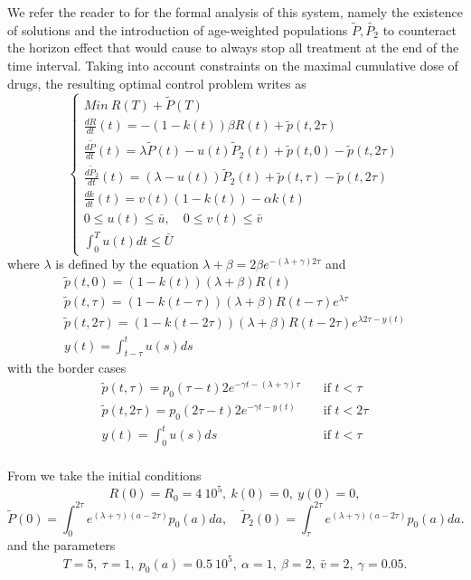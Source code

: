 \documentclass[a4paper]{article}
\begin{document}
We refer the reader to \cite{Dupuis14} for the formal analysis of this system, namely the existence of solutions and the 
introduction of age-weighted populations $\tilde{P}, \tilde{P_2}$ to counteract the horizon effect that would cause 
to always stop all treatment at the end of the time interval.
Taking into account constraints on the maximal cumulative dose of drugs, the resulting optimal control problem writes as
$$
\left \lbrace \begin{array}{l}
Min \ R(T) + \tilde{P}(T)\\
\frac{dR}{dt}(t) = -(1-k(t)) \beta R(t) + \tilde{p}(t,2\tau)\\
\frac{d\tilde{P}}{dt}(t) = \lambda \tilde{P}(t) - u(t) \tilde{P}_2(t) + \tilde{p}(t,0) - \tilde{p}(t,2\tau)\\
\frac{d\tilde{P}_2}{dt}(t) = (\lambda - u(t)) \tilde{P}_2(t) + \tilde{p}(t,\tau) - \tilde{p}(t,2\tau)\\
\frac{dk}{dt}(t) = v(t) (1-k(t)) - \alpha k(t)\\
0 \le u(t) \le \bar{u}, \quad 0 \le v(t) \le \bar{v}\\
\int_0^T u(t) dt \le \bar{U}
\end{array} \right .
$$
where $\lambda$ is defined by the equation $\lambda+\beta = 2 \beta e^{-(\lambda+\gamma)2\tau}$ and
$$
\begin{array}{l}
\tilde{p}(t,0)  =  (1-k(t))(\lambda+\beta)R(t)\\
\tilde{p}(t,\tau)  =  (1-k(t-\tau))(\lambda+\beta)R(t-\tau)e^{\lambda \tau}\\
\tilde{p}(t,2\tau)  =  (1-k(t-2\tau))(\lambda+\beta)R(t-2\tau)e^{\lambda 2\tau - y(t)}\\
y(t)  = \int_{t-\tau}^t u(s)ds
\end{array}
$$
with the border cases
$$
\begin{array}{ll}
\tilde{p}(t,\tau)  = p_0(\tau-t)2 e^{-\gamma t - (\lambda+\gamma)\tau} &\quad \text{if } t<\tau\\
\tilde{p}(t,2\tau)  = p_0(2\tau-t)2 e^{-\gamma t - y(t)} &\quad \text{if } t<2\tau \\
y(t)  = \int_0^t u(s)ds &\quad \text{if } t<\tau\\
\end{array}
$$

\noindent From \cite{Dupuis14} we take the initial conditions
$$
R(0)=R_0 = 4\ 10^5,\ k(0)=0,\ y(0)=0,
$$
$$
\tilde{P}(0)=\int_0^{2\tau}e^{(\lambda+\gamma)(a-2\tau)}p_0(a)da, \quad \tilde{P}_2(0)=\int_\tau^{2\tau}e^{(\lambda+\gamma)(a-2\tau)}p_0(a)da.
$$
and the parameters
$$
T=5,\ \tau=1,\ p_0(a)=0.5\ 10^5,\ \alpha=1,\ \beta=2,\ \bar{v}=2,\ \gamma=0.05.
$$
\end{document}
